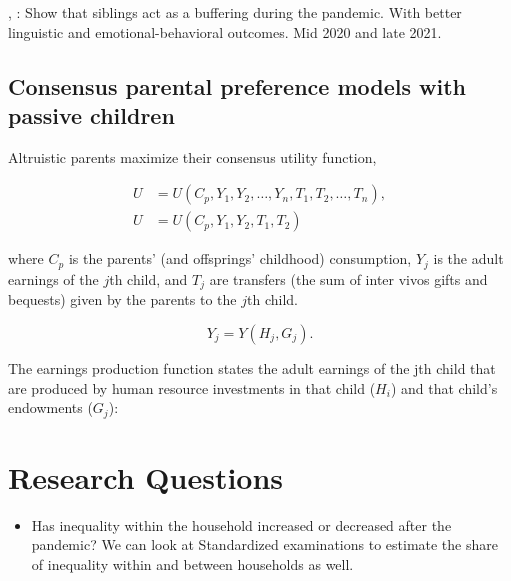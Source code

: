 \cite{hughes_siblings_2023}, \cite{lampis_long-lasting_2023}: Show that siblings act as a buffering during the pandemic. With better linguistic and emotional-behavioral outcomes. Mid 2020 and late 2021. 

\cite{}



\subsection{Consensus parental preference models with passive children}

Altruistic parents maximize their consensus utility function,

\begin{equation}
\begin{aligned}
U &= U(C_p, Y_1, Y_2, \ldots, Y_n, T_1, T_2, \ldots, T_n), \\
U &= U(C_p, Y_1, Y_2, T_1, T_2)
\end{aligned}
\tag{1}
\end{equation}

where $C_p$ is the parents' (and offsprings' childhood) consumption, $Y_j$ is the adult earnings of the $j$th child, and $T_j$ are transfers (the sum of inter vivos gifts and bequests) given by the parents to the $j$th child. 

\begin{equation}
Y_j = Y(H_j, G_j).
\tag{2}
\end{equation}

The earnings production function states the adult earnings of the jth child that are produced by human resource investments in that child ($H_i$) and that child's endowments ($G_j$):

\section{Research Questions}

\begin{itemize}
    \item Has inequality within the household increased or decreased after the pandemic? We can look at Standardized examinations to estimate the share of inequality within and between households as well. \cite{giannola_parental_2024}
\end{itemize}


